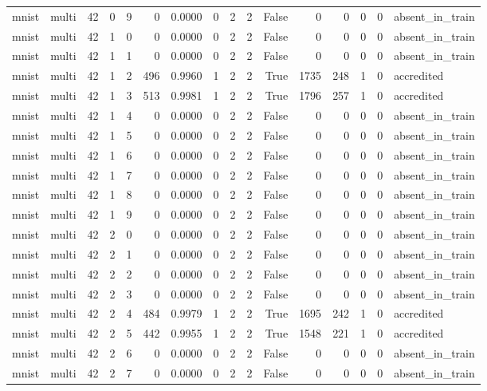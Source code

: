\begin{tabular}{llrrrrrrrrrrrrrl}
mnist & multi & 42 & 0 & 9 & 0 & 0.0000 & 0 & 2 & 2 & False & 0 & 0 & 0 & 0 & absent\_in\_train \\
mnist & multi & 42 & 1 & 0 & 0 & 0.0000 & 0 & 2 & 2 & False & 0 & 0 & 0 & 0 & absent\_in\_train \\
mnist & multi & 42 & 1 & 1 & 0 & 0.0000 & 0 & 2 & 2 & False & 0 & 0 & 0 & 0 & absent\_in\_train \\
mnist & multi & 42 & 1 & 2 & 496 & 0.9960 & 1 & 2 & 2 & True & 1735 & 248 & 1 & 0 & accredited \\
mnist & multi & 42 & 1 & 3 & 513 & 0.9981 & 1 & 2 & 2 & True & 1796 & 257 & 1 & 0 & accredited \\
mnist & multi & 42 & 1 & 4 & 0 & 0.0000 & 0 & 2 & 2 & False & 0 & 0 & 0 & 0 & absent\_in\_train \\
mnist & multi & 42 & 1 & 5 & 0 & 0.0000 & 0 & 2 & 2 & False & 0 & 0 & 0 & 0 & absent\_in\_train \\
mnist & multi & 42 & 1 & 6 & 0 & 0.0000 & 0 & 2 & 2 & False & 0 & 0 & 0 & 0 & absent\_in\_train \\
mnist & multi & 42 & 1 & 7 & 0 & 0.0000 & 0 & 2 & 2 & False & 0 & 0 & 0 & 0 & absent\_in\_train \\
mnist & multi & 42 & 1 & 8 & 0 & 0.0000 & 0 & 2 & 2 & False & 0 & 0 & 0 & 0 & absent\_in\_train \\
mnist & multi & 42 & 1 & 9 & 0 & 0.0000 & 0 & 2 & 2 & False & 0 & 0 & 0 & 0 & absent\_in\_train \\
mnist & multi & 42 & 2 & 0 & 0 & 0.0000 & 0 & 2 & 2 & False & 0 & 0 & 0 & 0 & absent\_in\_train \\
mnist & multi & 42 & 2 & 1 & 0 & 0.0000 & 0 & 2 & 2 & False & 0 & 0 & 0 & 0 & absent\_in\_train \\
mnist & multi & 42 & 2 & 2 & 0 & 0.0000 & 0 & 2 & 2 & False & 0 & 0 & 0 & 0 & absent\_in\_train \\
mnist & multi & 42 & 2 & 3 & 0 & 0.0000 & 0 & 2 & 2 & False & 0 & 0 & 0 & 0 & absent\_in\_train \\
mnist & multi & 42 & 2 & 4 & 484 & 0.9979 & 1 & 2 & 2 & True & 1695 & 242 & 1 & 0 & accredited \\
mnist & multi & 42 & 2 & 5 & 442 & 0.9955 & 1 & 2 & 2 & True & 1548 & 221 & 1 & 0 & accredited \\
mnist & multi & 42 & 2 & 6 & 0 & 0.0000 & 0 & 2 & 2 & False & 0 & 0 & 0 & 0 & absent\_in\_train \\
mnist & multi & 42 & 2 & 7 & 0 & 0.0000 & 0 & 2 & 2 & False & 0 & 0 & 0 & 0 & absent\_in\_train \\

\end{tabular}
